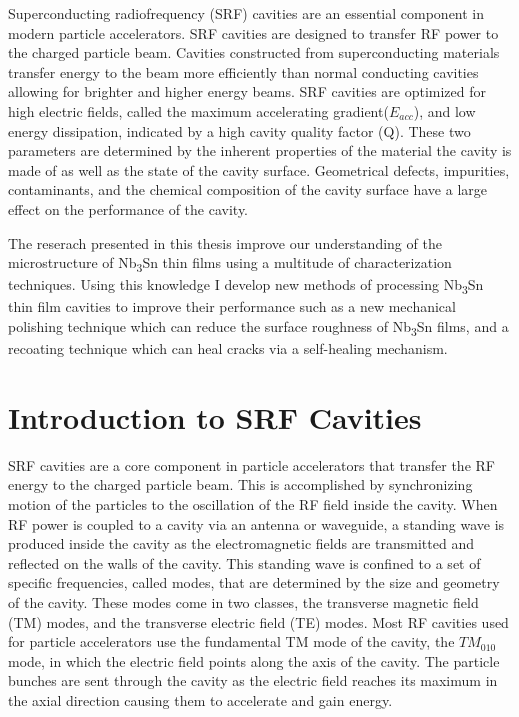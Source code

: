 Superconducting radiofrequency (SRF) cavities are an essential component in modern particle accelerators. SRF cavities are designed to transfer RF power to the charged particle beam. Cavities constructed from superconducting materials transfer energy to the beam more efficiently than normal conducting cavities allowing for brighter and higher energy beams. SRF cavities are optimized for high electric fields, called the maximum accelerating gradient($E_{acc}$), and low energy dissipation, indicated by a high cavity quality factor (Q). These two parameters are determined by the inherent properties of the material the cavity is made of as well as the state of the cavity surface. Geometrical defects, impurities, contaminants, and the chemical composition of the cavity surface have a large effect on the performance of the cavity.



The reserach presented in this thesis improve our understanding of the microstructure of Nb\textsubscript{3}Sn thin films using a multitude of characterization techniques. Using this knowledge I develop new methods of processing Nb\textsubscript{3}Sn thin film cavities to improve their performance such as a new mechanical polishing technique which can reduce the surface roughness of Nb\textsubscript{3}Sn films, and a recoating technique which can heal cracks via a self-healing mechanism.




\section{Introduction to SRF Cavities}


SRF cavities are a core component in particle accelerators that transfer the RF energy to the charged particle beam. This is accomplished by synchronizing motion of the particles to the oscillation of the RF field inside the cavity. When RF power is coupled to a cavity via an antenna or waveguide, a standing wave is produced inside the cavity as the electromagnetic fields are transmitted and reflected on the walls of the cavity. This standing wave is confined to a set of specific frequencies, called modes, that are determined by the size and geometry of the cavity. These modes come in two classes, the transverse magnetic field (TM) modes, and the transverse electric field (TE) modes. Most RF cavities used for particle accelerators use the fundamental TM mode of the cavity, the $TM_{010}$ mode, in which the electric field points along the axis of the cavity. The particle bunches are sent through the cavity as the electric field reaches its maximum in the axial direction causing them to accelerate and gain energy.


